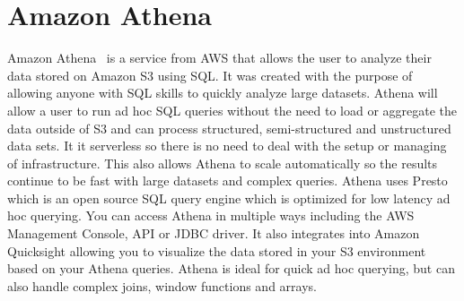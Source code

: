 \section{Amazon Athena}
Amazon Athena~\cite{hid-sp18-521-athena-faq} is a service from AWS that
allows the user to analyze their data stored on Amazon S3 using SQL\@. 
It was created with the purpose of allowing anyone with SQL skills 
to quickly analyze large datasets. Athena will allow a user to run 
ad hoc SQL queries without the need to load or aggregate the data 
outside of S3 and can process structured, semi-structured and 
unstructured data sets. It it serverless so there is no need to 
deal with the setup or managing of infrastructure. This also allows
Athena to scale automatically so the results continue to be fast 
with large datasets and complex queries. Athena uses Presto
which is an open source SQL query engine which is optimized for low
latency ad hoc querying. You can access Athena in multiple ways
including the AWS Management Console, API or JDBC driver. It also
integrates into Amazon Quicksight allowing you to visualize the data
stored in your S3 environment based on your Athena queries. Athena is
ideal for quick ad hoc querying, but can also handle complex joins,
window functions and arrays.
